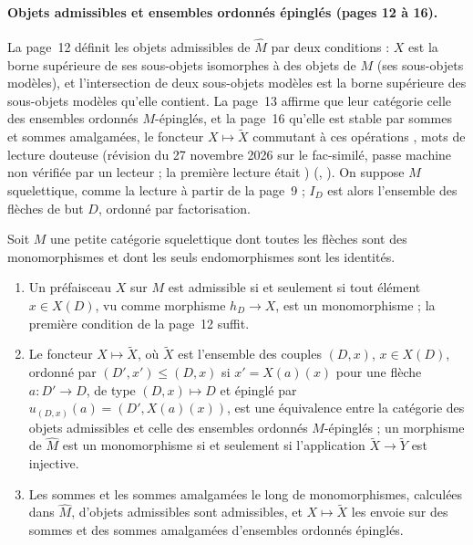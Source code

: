 \paragraph{Objets admissibles et ensembles ordonnés épinglés (pages 12 à 16).} La page~12 définit les objets admissibles de $\widehat M$ par deux conditions : $X$ est la borne supérieure de ses sous-objets isomorphes à des objets de $M$ (ses sous-objets modèles), et l'intersection de deux sous-objets modèles est la borne supérieure des sous-objets modèles qu'elle contient. La page~13 affirme que leur catégorie  celle des ensembles ordonnés $M$-épinglés, et la page~16 qu'elle est stable par sommes et sommes amalgamées, le foncteur $X \mapsto \widetilde X$ commutant à ces opérations , mots de lecture douteuse (révision du 27 novembre 2026 sur le fac-similé, passe machine non vérifiée par un lecteur ; la première lecture était ) (, ). On suppose $M$ squelettique, comme la lecture à partir de la page~9 ; $I_D$ est alors l'ensemble des flèches de but $D$, ordonné par factorisation.

\begin{encadre}
\begin{theoreme}
Soit $M$ une petite catégorie squelettique dont toutes les flèches sont des monomorphismes et dont les seuls endomorphismes sont les identités.
\begin{enumerate}
\item Un préfaisceau $X$ sur $M$ est admissible si et seulement si tout élément $x \in X(D)$, vu comme morphisme $h_D \to X$, est un monomorphisme ; la première condition de la page~12 suffit.
\item Le foncteur $X \mapsto \widetilde X$, où $\widetilde X$ est l'ensemble des couples $(D, x)$, $x \in X(D)$, ordonné par $(D', x') \leq (D, x)$ si $x' = X(a)(x)$ pour une flèche $a : D' \to D$, de type $(D, x) \mapsto D$ et épinglé par $u_{(D,x)}(a) = (D', X(a)(x))$, est une équivalence entre la catégorie des objets admissibles et celle des ensembles ordonnés $M$-épinglés ; un morphisme de $\widehat M$ est un monomorphisme si et seulement si l'application $\widetilde X \to \widetilde Y$ est injective.
\item Les sommes et les sommes amalgamées le long de monomorphismes, calculées dans $\widehat M$, d'objets admissibles sont admissibles, et $X \mapsto \widetilde X$ les envoie sur des sommes et des sommes amalgamées d'ensembles ordonnés épinglés.
\end{enumerate}
\end{theoreme}
\end{encadre}

